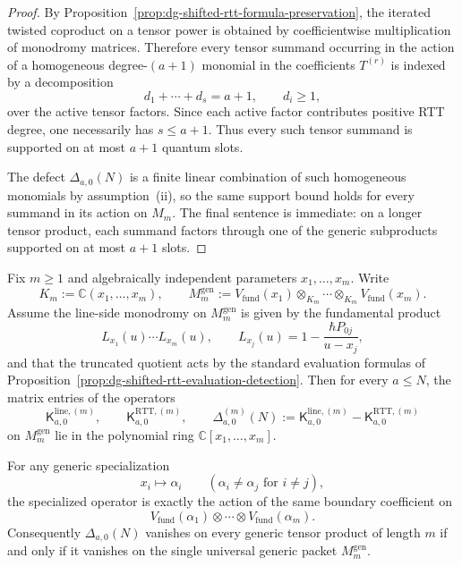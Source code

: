 \begin{proof}
By
Proposition~\ref{prop:dg-shifted-rtt-formula-preservation},
the iterated twisted coproduct on a tensor power is obtained by
coefficientwise multiplication of monodromy matrices.  Therefore every
tensor summand occurring in the action of a homogeneous degree-$(a+1)$
monomial in the coefficients $T^{(r)}$ is indexed by a decomposition
\[
d_1+\cdots+d_s=a+1,
\qquad d_i\ge1,
\]
over the active tensor factors.  Since each active factor contributes
positive RTT degree, one necessarily has $s\le a+1$.  Thus every such
tensor summand is supported on at most $a+1$ quantum slots.

The defect $\Delta_{a,0}(N)$ is a finite linear combination of such
homogeneous monomials by assumption~\textup{(ii)}, so the same support
bound holds for every summand in its action on $M_m$.  The final
sentence is immediate: on a longer tensor product, each summand factors
through one of the generic subproducts supported on at most $a+1$
slots.
\end{proof}

\begin{proposition}
\label{prop:dg-shifted-rtt-universal-generic-packets}
Fix $m\ge1$ and algebraically independent parameters
$x_1,\dots,x_m$.  Write
\[
K_m:=\mathbb{C}(x_1,\dots,x_m),
\qquad
M_m^{\mathrm{gen}}
:=
V_{\mathrm{fund}}(x_1)\otimes_{K_m}\cdots\otimes_{K_m}
V_{\mathrm{fund}}(x_m).
\]
Assume the line-side monodromy on $M_m^{\mathrm{gen}}$ is given by the
fundamental product
\[
L_{x_1}(u)\cdots L_{x_m}(u),
\qquad
L_{x_j}(u)=1-\frac{\hbar P_{0j}}{u-x_j},
\]
and that the truncated quotient acts by the standard evaluation
formulas of Proposition~\ref{prop:dg-shifted-rtt-evaluation-detection}.
Then for every $a\le N$, the matrix entries of the operators
\[
\mathsf{K}^{\mathrm{line},(m)}_{a,0},
\qquad
\mathsf{K}^{\mathrm{RTT},(m)}_{a,0},
\qquad
\Delta^{(m)}_{a,0}(N)
:=
\mathsf{K}^{\mathrm{line},(m)}_{a,0}
-\mathsf{K}^{\mathrm{RTT},(m)}_{a,0}
\]
on $M_m^{\mathrm{gen}}$ lie in the polynomial ring
$\mathbb{C}[x_1,\dots,x_m]$.

For any generic specialization
\[
x_i\mapsto \alpha_i
\qquad (\alpha_i\neq \alpha_j \text{ for } i\neq j),
\]
the specialized operator is exactly the action of the same boundary
coefficient on
\[
V_{\mathrm{fund}}(\alpha_1)\otimes\cdots\otimes
V_{\mathrm{fund}}(\alpha_m).
\]
Consequently $\Delta_{a,0}(N)$ vanishes on every generic tensor product
of length $m$ if and only if it vanishes on the single universal
generic packet $M_m^{\mathrm{gen}}$.
\end{proposition}

